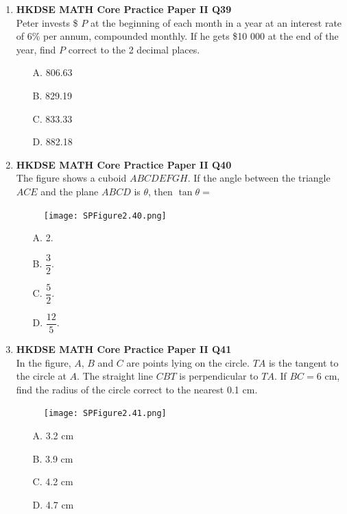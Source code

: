 \documentclass[12pt]{article}
\begin{document}
\begin{enumerate}
	\item \textbf{HKDSE MATH Core Practice Paper II Q39}\\
	Peter invests \$ $P$ at the beginning of each month in a year at an interest rate of 6\% per annum, compounded monthly. If he gets \$10 000 at the end of the year, find $P$ correct to the 2 decimal places.
	\begin{enumerate}
		\item[A.] 806.63
		\item[B.] 829.19
		\item[C.] 833.33
		\item[D.] 882.18
	\end{enumerate}
	
	\item \textbf{HKDSE MATH Core Practice Paper II Q40}\\
	The figure shows a cuboid $ABCDEFGH$. If the angle between the triangle $ACE$ and the plane $ABCD$ is $\theta$, then $\tan{\theta} = $
	\begin{figure}[H]
		\centering
		\texttt{[image: SPFigure2.40.png]}	
	\end{figure}
	\begin{enumerate}
		\item[A.] 2.
		\item[B.] $\dfrac{3}{2}$.
		\item[C.] $\dfrac{5}{2}$.
		\item[D.] $\dfrac{12}{5}$.
	\end{enumerate}
	
	\item \textbf{HKDSE MATH Core Practice Paper II Q41}\\
	In the figure, $A$, $B$ and $C$ are points lying on the circle. $TA$ is the tangent to the circle at $A$. The straight line $CBT$ is perpendicular to $TA$. If $BC = 6$ cm, find the radius of the circle correct to the nearest 0.1 cm.
	\begin{figure}[H]
		\centering
		\texttt{[image: SPFigure2.41.png]}	
	\end{figure}
	\begin{enumerate}
		\item[A.] 3.2 cm
		\item[B.] 3.9 cm
		\item[C.] 4.2 cm
		\item[D.] 4.7 cm
	\end{enumerate}
	

\end{enumerate}
\end{document}
